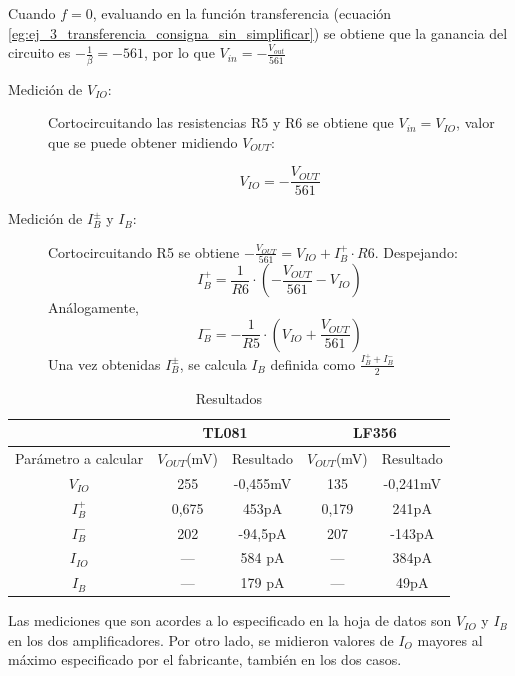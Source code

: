 \documentclass[../../main.tex]{subfiles}
\begin{document}
Cuando $f=0$, evaluando en la funci\'on transferencia (ecuaci\'on \ref{eg:ej_3_transferencia_consigna_sin_simplificar}) se obtiene que la ganancia del circuito es $-\frac{1}{\beta}=-561$, por lo que $V_{in}=-\frac{V_{out}}{561}$


\begin{description}%
	\item[Medici\'on de $V_{IO}$:] Cortocircuitando las resistencias R5 y R6 se obtiene que $V_{in} = V_{IO}$, valor que se puede obtener midiendo $V_{OUT}$:
	
	\[V_{IO} = -\frac{V_{OUT}}{561}\]
	\item[Medici\'on de $I_B^\pm$ y $I_B$:] Cortocircuitando R5 se obtiene $-\frac{V_{OUT}}{561} = V_{IO} + I_B^+\cdot R6$. Despejando:
	\[I_B^+=\frac{1}{R6}\cdot\left( -\frac{V_{OUT}}{561}-V_{IO}  \right) \]
	An\'alogamente,
	\[I_B^-=-\frac{1}{R5}\cdot \left( V_{IO} + \frac{V_{OUT}}{561}   \right)\]
	Una vez obtenidas $I_B^\pm$, se calcula $I_B$ definida como $\frac{I_B^++I_B^-}{2}$
\end{description}

\begin{table}[htbp]%
\centering
\begin{tabular}{ccccc}
                       & \multicolumn{2}{c}{TL081} & \multicolumn{2}{c}{LF356} \\
\hline
Par\'ametro a calcular & $V_{OUT}$(mV)& Resultado  & $V_{OUT}$(mV)& Resultado  \\
\hline
$V_{IO}$               & 255          & -0,455mV   & 135          & -0,241mV   \\
$I_B^+$                & 0,675        & 453pA      & 0,179        & 241pA      \\
$I_B^-$                & 202          & -94,5pA    & 207          & -143pA     \\
$I_{IO}$			   &     ---      & 584 pA	   &	  ---     & 384pA      \\
$I_B$				   &     ---      & 179 pA     &      ---     & 49pA
\end{tabular}%

\caption{Resultados}
\label{tab:ej_3_resultados}
\end{table}

Las mediciones que son acordes a lo especificado en la hoja de datos son $V_{IO}$  y $I_B$ en los dos amplificadores. Por otro lado, se midieron valores de $I_O$ mayores al m\'aximo especificado por el fabricante, tambi\'en en los dos casos.
\end{document}

